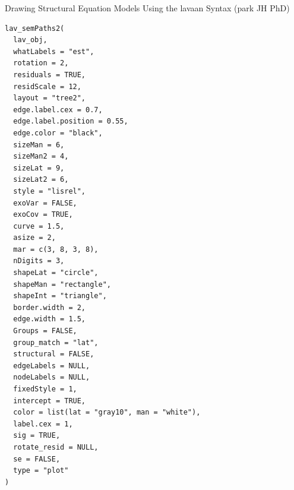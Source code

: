 \documentclass[a4paper]{book}
\begin{document}
%
\begin{Description}
Drawing Structural Equation Models Using the lavaan Syntax (park JH PhD)
\end{Description}
%
\begin{Usage}
\begin{verbatim}
lav_semPaths2(
  lav_obj,
  whatLabels = "est",
  rotation = 2,
  residuals = TRUE,
  residScale = 12,
  layout = "tree2",
  edge.label.cex = 0.7,
  edge.label.position = 0.55,
  edge.color = "black",
  sizeMan = 6,
  sizeMan2 = 4,
  sizeLat = 9,
  sizeLat2 = 6,
  style = "lisrel",
  exoVar = FALSE,
  exoCov = TRUE,
  curve = 1.5,
  asize = 2,
  mar = c(3, 8, 3, 8),
  nDigits = 3,
  shapeLat = "circle",
  shapeMan = "rectangle",
  shapeInt = "triangle",
  border.width = 2,
  edge.width = 1.5,
  Groups = FALSE,
  group_match = "lat",
  structural = FALSE,
  edgeLabels = NULL,
  nodeLabels = NULL,
  fixedStyle = 1,
  intercept = TRUE,
  color = list(lat = "gray10", man = "white"),
  label.cex = 1,
  sig = TRUE,
  rotate_resid = NULL,
  se = FALSE,
  type = "plot"
)
\end{verbatim}
\end{Usage}
%
\end{document}
